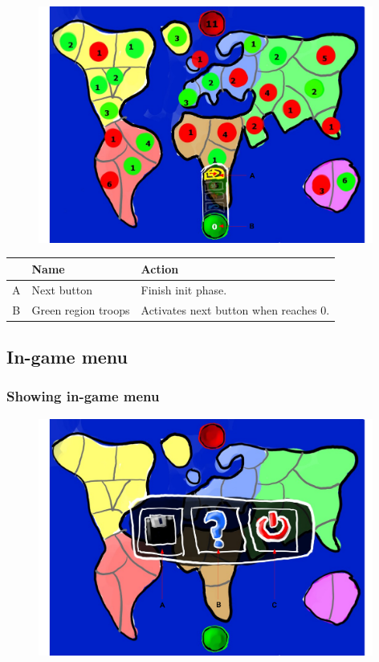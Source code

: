 \documentclass[12pt,a4paper]{article}
\begin{document}
\begin{figure}[H]
  \centering
  \includegraphics[width=11cm]{pic/mocks/3-6.pdf}
\end{figure}

\begin{table}[H]
\small
\centering
\begin{tabular}{c|p{5cm}|p{7cm}}
& Name & Action \\ \hline\hline
A
&Next button
&Finish init phase.
\\B
&Green region troops
&Activates next button when reaches 0.
\end{tabular}
\end{table}


\subsection{In-game menu}

\subsubsection{Showing in-game menu}

\begin{figure}[H]
  \centering
  \includegraphics[width=11cm]{pic/mocks/4-1.pdf}
\end{figure}
\end{document}
